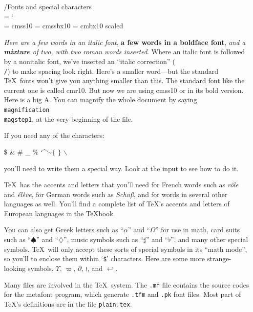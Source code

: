 /{Fonts and special characters}
\chardef \\ = `\\ %

\font\tencmss = cmss10  %
\font\tencmssbx = cmssbx10
\font\bigbf = cmbx10 scaled   %

{\it Here are a few words in an italic font}, {\bf a few words in a boldface font}, {\it and a\/
{\bf mixture} of two, with two\/ {\rm roman words} inserted}.  Where an italic font is followed by
a nonitalic font, we've inserted an ``italic correction'' ({\tt \\/}) to make spacing look right.
Here's a {\sevenrm smaller} word---but the standard \TeX\ fonts won't give you anything smaller
than {\fiverm this}. The standard font like the current one is called cmr10.  {\tencmss But now
we are using cmss10} {\tencmssbx or in its bold version}.  Here is a {\bigbf big A}.  You can magnify 
the whole document by saying {\tt \\magnification \\magstep1}, at the very beginning of the file.

If you need any of the characters:
\medskip
\centerline{\$ \quad \& \quad \# \quad \_ \quad \% \quad 
\char`\^ \quad \char`\~ \quad $\{$ \quad $\}$ \quad $\backslash$}
\medskip
\noindent you'll need to write them a special way. Look at the input to see how to do it. 

\TeX\ has the accents and letters that you'll need for French words such as {\it r\^ ole\/} and
{\it \'el\`eve}, for German words such as {\it Schu\ss}, and for words in several other languages
as well.  You'll find a complete list of \TeX's accents and letters of European languages in the
\TeX book. 

You can also get Greek letters such as ``$\alpha$'' and ``$\Omega$'' for use in math, card suits
such as ``$\spadesuit$'' and ``$\diamondsuit$'', music symbols such as ``$\sharp$'' and
``$\flat$'', and many other special symbols.  \TeX\ will only accept these sorts of special symbols
in its ``math mode'', so you'll to enclose them within `{\tt \$}' characters.  Here are some
more strange-looking symbols, $\Upsilon$, $\varpi$, $\partial$, $\wr$,
and $\hookleftarrow$.

Many files are involved in the \TeX\ system. The {\tt .mf} file contains the source codes for
the metafont program, which generate {\tt .tfm} and {\tt .pk} font files.  Most part of \TeX's
definitions are in the file {\tt plain.tex}.  
